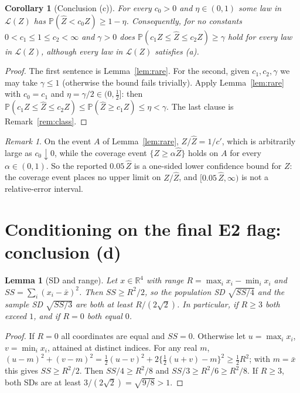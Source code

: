 \documentclass[11pt]{article}
\newtheorem{lemma}[theorem]{Lemma}
\newtheorem{corollary}[theorem]{Corollary}
\theoremstyle{remark}
\newtheorem{remark}[theorem]{Remark}
\newcommand{\Zh}{\widehat Z}
\newcommand{\cL}{\mathcal{L}}
\begin{document}
\begin{corollary}[Conclusion (c)]\label{cor:c}
For every $c_0>0$ and $\eta\in(0,1)$ some law in $\cL(Z)$ has $\mathbb{P}(\Zh<c_0Z)\ge1-\eta$. Consequently, for no
constants $0<c_1\le1\le c_2<\infty$ and $\gamma>0$ does $\mathbb{P}(c_1Z\le\Zh\le c_2Z)\ge\gamma$ hold for every law in
$\cL(Z)$, although every law in $\cL(Z)$ satisfies (a).
\end{corollary}

\begin{proof}
The first sentence is Lemma~\ref{lem:rare}. For the second, given $c_1,c_2,\gamma$ we may take $\gamma\le1$ (otherwise the
bound fails trivially). Apply Lemma~\ref{lem:rare} with $c_0=c_1$ and $\eta=\gamma/2\in(0,\tfrac12]$: then
$\mathbb{P}(c_1Z\le\Zh\le c_2Z)\le\mathbb{P}(\Zh\ge c_1Z)\le\eta<\gamma$. The last clause is Remark~\ref{rem:class}.
\end{proof}

\begin{remark}
On the event $A$ of Lemma~\ref{lem:rare}, $Z/\Zh=1/c'$, which is arbitrarily large as $c_0\downarrow0$, while the coverage
event $\{Z\ge\alpha\Zh\}$ holds on $A$ for every $\alpha\in(0,1)$. So the reported $0.05\,\Zh$ is a one-sided lower
confidence bound for $Z$: the coverage event places no upper limit on $Z/\Zh$, and $[0.05\,\Zh,\infty)$ is not a
relative-error interval.
\end{remark}

\section{Conditioning on the final E2 flag: conclusion (d)}

\begin{lemma}[SD and range]\label{lem:sd}
Let $x\in\mathbb{R}^4$ with range $R=\max_ix_i-\min_ix_i$ and $SS=\sum_i(x_i-\bar x)^2$. Then $SS\ge R^2/2$, so the
population SD $\sqrt{SS/4}$ and the sample SD $\sqrt{SS/3}$ are both at least $R/(2\sqrt2)$. In particular, if $R\ge3$
both exceed $1$, and if $R=0$ both equal $0$.
\end{lemma}

\begin{proof}
If $R=0$ all coordinates are equal and $SS=0$. Otherwise let $u=\max_ix_i$, $v=\min_ix_i$, attained at distinct indices.
For any real $m$, $(u-m)^2+(v-m)^2=\tfrac12(u-v)^2+2\{\tfrac12(u+v)-m\}^2\ge\tfrac12R^2$; with $m=\bar x$ this gives
$SS\ge R^2/2$. Then $SS/4\ge R^2/8$ and $SS/3\ge R^2/6\ge R^2/8$. If $R\ge3$, both SDs are at least
$3/(2\sqrt2)=\sqrt{9/8}>1$.
\end{proof}
\end{document}
